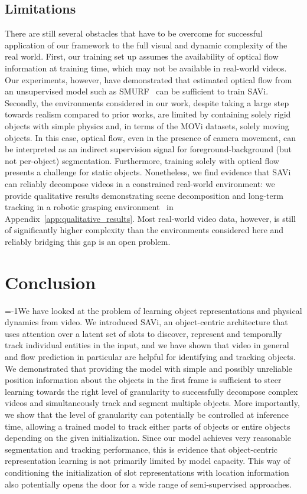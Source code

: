 \documentclass{article}
\newcommand{\modelname}{SAVi\xspace}
\begin{document}
\subsection{Limitations}
\label{sec:discussion}
There are still several obstacles that have to be overcome for successful application of our framework to the full visual and dynamic complexity of the real world. First, our training set up assumes the availability of optical flow information at training time, which may not be available in real-world videos. Our experiments, however, have demonstrated that estimated optical flow from an unsupervised model such as SMURF~\citep{stone2021smurf} can be sufficient to train \modelname. Secondly, the environments considered in our work, despite taking a large step towards realism compared to prior works, are limited by containing solely rigid objects with simple physics and, in terms of the MOVi datasets, solely moving objects. In this case, optical flow, even in the presence of camera movement, can be interpreted as an indirect supervision signal for foreground-background (but not per-object) segmentation. Furthermore, training solely with optical flow presents a challenge for static objects.
%
Nonetheless, we find evidence that SAVi can reliably decompose videos in a constrained real-world environment: we provide qualitative results demonstrating scene decomposition and long-term tracking in a robotic grasping environment~\citep{cabi2020scaling} in Appendix~\ref{app:qualitative_results}. Most real-world video data, however, is still of significantly higher complexity than the environments considered here and reliably bridging this gap is an open problem.


\section{Conclusion}
\label{sec:conclusion}
\looseness=-1We have looked at the problem of learning object representations and physical dynamics from video.
We introduced \modelname, an object-centric architecture that uses attention over a latent set of slots to discover, represent and temporally track individual entities in the input, and we have shown that video in general and flow prediction in particular are helpful for identifying and tracking objects.
We demonstrated that providing the model with simple and possibly unreliable position information about the objects in the first frame is sufficient to steer learning towards the right level of granularity to successfully decompose complex videos and simultaneously track and segment multiple objects.
More importantly, we show that the level of granularity can potentially be controlled at inference time, allowing a trained model to track either parts of objects or entire objects depending on the given initialization.
%
Since our model achieves very reasonable segmentation and tracking performance, this is evidence that object-centric representation learning is not primarily limited by model capacity. 
This way of conditioning the initialization of slot representations with location information also potentially opens the door for a wide range of semi-supervised approaches.
\end{document}
